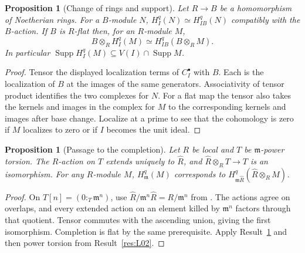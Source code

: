 \documentclass[11pt,oneside,openany]{book}
\newtheorem{proposition}[theorem]{Proposition}
\theoremstyle{definition}
\theoremstyle{remark}
\begin{document}
\begin{proposition}[Change of rings and support]\label{res:L08}
Let \(R\to B\) be a homomorphism of Noetherian rings. For a \(B\)-module
\(N\), \(H_I^q(N)\simeq H_{IB}^q(N)\) compatibly with the \(B\)-action.
If \(B\) is \(R\)-flat then, for an \(R\)-module \(M\),
\[
 B\otimes_R H_I^q(M)\simeq H_{IB}^q(B\otimes_RM).
\]
In particular \(\operatorname{Supp} H_I^q(M)
\subseteq V(I)\cap\operatorname{Supp}M\).
\end{proposition}
\begin{proof}
Tensor the displayed localization terms of \(C_I^\bullet\) with \(B\).
Each is the localization of \(B\) at the images of the same generators.
Associativity of tensor product identifies the two complexes for \(N\).
For a flat map the tensor also takes the kernels and images in the
complex for \(M\) to the corresponding kernels and images after base
change. Localize at a prime to see that the cohomology is zero if \(M\)
localizes to zero or if \(I\) becomes the unit ideal.
\end{proof}

\begin{proposition}[Passage to the completion]\label{res:L09}
Let \(R\) be local and \(T\) be \(\mathfrak m\)-power torsion.
The \(R\)-action on \(T\) extends uniquely to \(\widehat R\), and
\(\widehat R\otimes_R T\to T\) is an isomorphism. For any \(R\)-module
\(M\), \(H^q_{\mathfrak m}(M)\) corresponds to
\(H^q_{\mathfrak m\widehat R}(\widehat R\otimes_RM)\).
\end{proposition}
\begin{proof}
On \(T[n]=(0:_T\mathfrak m^n)\), use
\(\widehat R/\mathfrak m^n\widehat R=R/\mathfrak m^n\)
from \cite[ALG-05-C04-S01]{p103}. The actions agree on overlaps,
and every extended action on an element killed by \(\mathfrak m^n\)
factors through that quotient. Tensor commutes with the ascending
union, giving the first isomorphism. Completion is flat by the same
prerequisite. Apply Result~\ref{res:L08} and then power torsion from
Result~\ref{res:L02}.
\end{proof}
\end{document}
